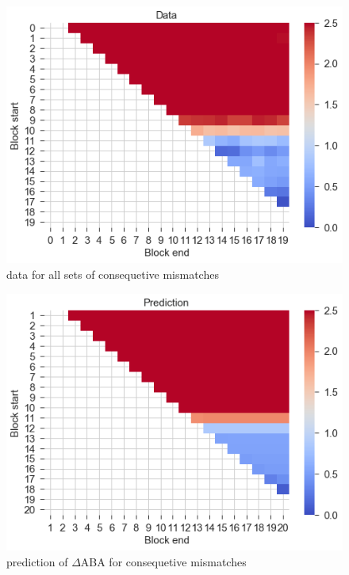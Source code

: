 \documentclass[a4paper,twoside]{revtex4-1}
\begin{document}
\begin{figure}[H]
	\centering
	\includegraphics[width=\textwidth]{block_mm_experiment}
	\caption{data for all sets of consequetive mismatches  }
\end{figure}

\begin{figure}[H]
	\centering
	\includegraphics[width=\textwidth]{block_mm_prediction}
	\caption{prediction of $\Delta$ABA for consequetive mismatches  }
\end{figure}
\end{document}

